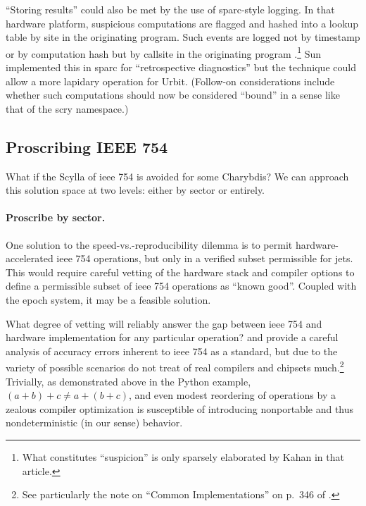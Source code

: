 \documentclass[twoside]{article}
\begin{document}
“Storing results” could also be met by the use of {\sc sparc}-style logging.  In that hardware platform, suspicious computations are flagged and hashed into a lookup table by site in the originating program.  Such events are logged not by timestamp or by computation hash but by callsite in the originating program \citetext{\citet{Kahan1997}, p.~6}.\footnote{What constitutes “suspicion” is only sparsely elaborated by Kahan in that article.}  Sun implemented this in {\sc sparc} for “retrospective diagnostics” but the technique could allow a more lapidary operation for Urbit.  (Follow-on considerations include whether such computations should now be considered “bound” in a sense like that of the scry namespace.)

\subsection[Proscribing {\sc ieee} 754]{Proscribing IEEE 754}

What if the Scylla of {\sc ieee} 754 is avoided for some Charybdis?  We can approach this solution space at two levels:  either by sector or entirely.

\paragraph{Proscribe by sector.}

One solution to the speed-vs.-reproducibility dilemma is to permit hardware-accelerated {\sc ieee} 754 operations, but only in a verified subset permissible for jets.  This would require careful vetting of the hardware stack and compiler options to define a permissible subset of {\sc ieee} 754 operations as “known good”.  Coupled with the epoch system, it may be a feasible solution.

What degree of vetting will reliably answer the gap between {\sc ieee} 754 and hardware implementation for any particular operation?  \citetext{\citet{Jones2008}, pp.~330ff.} and \citet{Goldberg1991} provide a careful analysis of accuracy errors inherent to {\sc ieee} 754 as a standard, but due to the variety of possible scenarios do not treat of real compilers and chipsets much.\footnote{See particularly the note on “Common Implementations” on p.~346 of \citet{Jones2008}.}  Trivially, as demonstrated above in the Python example, $(a + b) + c \neq a + (b + c)$, and even modest reordering of operations by a zealous compiler optimization is susceptible of introducing nonportable and thus nondeterministic (in our sense) behavior.
\end{document}
